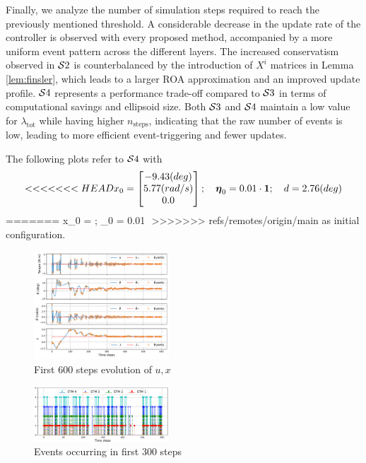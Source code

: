 \documentclass{ifacconf}
\theoremstyle{plain}
\begin{document}
Finally, we analyze the number of simulation steps required to reach the previously mentioned threshold. A considerable decrease in the update rate of the controller is observed with every proposed method, accompanied by a more uniform event pattern across the different layers. The increased conservatism observed in ${\mathcal{S}} 2$ is counterbalanced by the introduction of $X^i$ matrices in Lemma \ref{lem:finsler}, which leads to a larger ROA approximation and an improved update profile. ${\mathcal{S}} 4$ represents a performance trade-off compared to ${\mathcal{S}} 3$ in terms of computational savings and ellipsoid size. Both ${\mathcal{S}} 3$ and ${\mathcal{S}} 4$ maintain a low value for $\lambda_{\text{tot}}$ while having higher $n_{\text{steps}}$, indicating that the raw number of events is low, leading to more efficient event-triggering and fewer updates.

The following plots refer to $\cS 4$ with $$
<<<<<<< HEAD
x_0 = \bmx{-9.43(deg) \\ 5.77(rad/s) \\  0.0}; \quad \boldsymbol{\eta}_0 = 0.01 \cdot \1; \quad d = 2.76(deg)$$ 
=======
x_0 = \tr; \quad \boldsymbol{\eta}_0 = 0.01 \cdot \1$$ 
>>>>>>> refs/remotes/origin/main
as initial configuration.

\begin{figure}[H]
    \centering
    \includegraphics[width=0.45\textwidth]{Figures/evolution_plot}
    \caption{First $600$ steps evolution of $u, x$}
    \label{fig:evolution}
\end{figure}

\begin{figure}[H]
    \centering
    \includegraphics[width=0.45\textwidth]{Figures/event_plot}
    \caption{Events occurring in first $300$ steps}
    \label{fig:events}
\end{figure}
\end{document}
